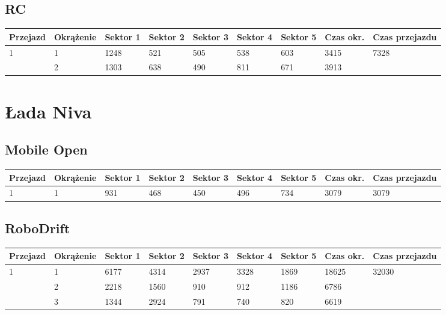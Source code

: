 \documentclass[11pt]{article}
\begin{document}
\subsection{RC}
\begin{table}[h]
\begin{tabular}{|l|l|l|l|l|l|l|l|l|}
\hline
 Przejazd        & Okrążenie & Sektor 1 & Sektor 2 & Sektor 3 & Sektor 4 & Sektor 5 & Czas okr. & Czas przejazdu    \\ \hline
\multirow{2}{*}{1}& 1 &1248& 521& 505& 538& 603& 3415& \multirow{2}{*}{7328} \\ \cline{2-8}
& 2& 1303& 638& 490& 811& 671& 3913& \\ \hline
\end{tabular}
\end{table}
\pagebreak
\section{Łada Niva}
\subsection{Mobile Open}
\begin{table}[h]
\begin{tabular}{|l|l|l|l|l|l|l|l|l|}
\hline
   Przejazd        & Okrążenie & Sektor 1 & Sektor 2 & Sektor 3 & Sektor 4 & Sektor 5 & Czas okr. & Czas przejazdu    \\ \hline
\multirow{1}{*}{1}& 1 &931& 468& 450& 496& 734& 3079& 3079\\ \hline
\end{tabular}
\end{table}
\subsection{RoboDrift}
\begin{table}[h]
\begin{tabular}{|l|l|l|l|l|l|l|l|l|}
\hline
   Przejazd        & Okrążenie & Sektor 1 & Sektor 2 & Sektor 3 & Sektor 4 & Sektor 5 & Czas okr. & Czas przejazdu    \\ \hline
\multirow{3}{*}{1}& 1 &6177& 4314& 2937& 3328& 1869& 18625& \multirow{3}{*}{32030} \\ \cline{2-8}
& 2& 2218& 1560& 910& 912& 1186& 6786& \\ \cline{2-8}
& 3& 1344& 2924& 791& 740& 820& 6619& \\ \hline
\end{tabular}
\end{table}
\end{document}
